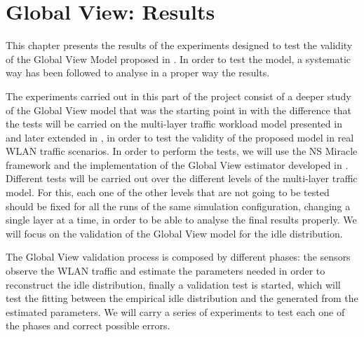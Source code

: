 \chapter{Global View: Results} \label{chapter:global_results}
This chapter presents the results of the experiments designed to test the validity of the Global View Model proposed in \cite{ioannis}. In order to test the model, a systematic way has been followed to analyse in a proper way the results. 

The experiments carried out in this part of the project consist of a deeper study of the Global View model that was the starting point in \cite{marcello} with the difference that the tests will be carried on the multi-layer traffic workload model presented in \cite{Campus-WLAN} and later extended in \cite{marcello}, in order to test the validity of the proposed model in real \acs{WLAN} traffic scenarios. In order to perform the tests, we will use the NS Miracle framework and the implementation of the Global View estimator developed in \cite{marcello}. Different tests will be carried out over the different levels of the multi-layer traffic model. For this, each one of the other levels that are not going to be tested should be fixed for all the runs of the same simulation configuration, changing a single layer at a time, in order to be able to analyse the final results properly. We will focus on the validation of the Global View model for the idle distribution.

The Global View validation process is composed by different phases: the sensors observe the \acs{WLAN} traffic and estimate the parameters needed in order to reconstruct the idle distribution, finally a validation test is started, which will test the fitting between the empirical idle distribution and the generated from the estimated parameters. We will carry a series of experiments to test each one of the phases and correct possible errors.
